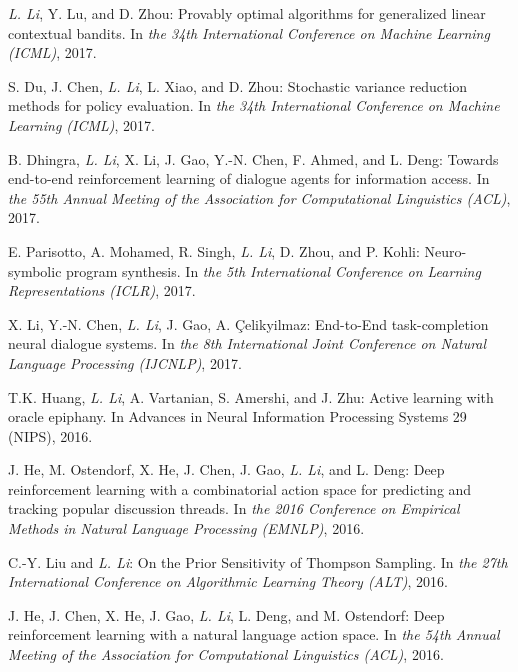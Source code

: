\documentclass[10pt,twoside,letterpaper]{article}
\newcommand{\selffont}[1]{{\textit{#1}}}
\newcommand{\venuefont}[1]{{\textit{#1}}}
\newcommand{\myself}{\selffont{L. Li}}
\begin{document}
\begin{compactenum}[(C1)]
\item{\myself, Y. Lu, and D. Zhou: Provably optimal algorithms for generalized linear contextual bandits.  In \venuefont{the 34th International Conference on Machine Learning (ICML)}, 2017.}

\item{S. Du, J. Chen, \myself, L. Xiao, and D. Zhou: Stochastic variance reduction methods for policy evaluation.  In \venuefont{the 34th International Conference on Machine Learning (ICML)}, 2017.}

\item{B. Dhingra, \myself, X. Li, J. Gao, Y.-N. Chen, F. Ahmed, and L. Deng: Towards end-to-end reinforcement learning of dialogue agents for information access.  In \venuefont{the 55th Annual Meeting of the Association for Computational Linguistics (ACL)}, 2017.}

\item{E. Parisotto, A. Mohamed, R. Singh, \myself, D. Zhou, and P. Kohli: Neuro-symbolic program synthesis.  In \venuefont{the 5th International Conference on Learning Representations (ICLR)}, 2017.}

\item{X. Li, Y.-N. Chen, \myself, J. Gao, A. Çelikyilmaz: End-to-End task-completion neural dialogue systems.  In \venuefont{the 8th International Joint Conference on Natural Language Processing (IJCNLP)}, 2017.}

\item{T.K. Huang, \myself, A. Vartanian, S. Amershi, and J. Zhu: Active learning with oracle epiphany.  In Advances in Neural Information Processing Systems 29 (NIPS), 2016.}

\item{J. He, M. Ostendorf, X. He, J. Chen, J. Gao, \myself, and L. Deng: Deep reinforcement learning with a combinatorial action space for predicting and tracking popular discussion threads.  In \venuefont{the 2016 Conference on Empirical Methods in Natural Language Processing (EMNLP)}, 2016.}

\item{C.-Y. Liu and \myself: On the Prior Sensitivity of Thompson Sampling. In \venuefont{the 27th International Conference on Algorithmic Learning Theory (ALT)}, 2016.}

\item{J. He, J. Chen, X. He, J. Gao, \myself, L. Deng, and M. Ostendorf: Deep reinforcement learning with a natural language action space.  In \venuefont{the 54th Annual Meeting of the Association for Computational Linguistics (ACL)}, 2016.}


\end{compactenum}
\end{document}
